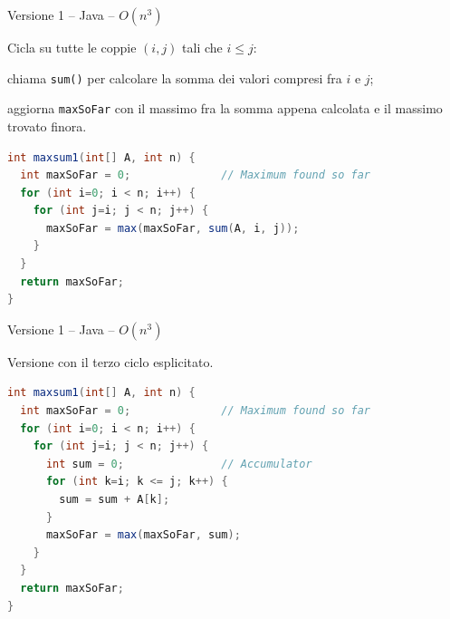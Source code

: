\begin{frame}[fragile]{Versione 1 -- Java -- $O(n^3)$}


\vspace{-6pt}
\begin{mdframed}[style=mybox]
\begingroup
\small
Cicla su tutte le coppie $(i,j)$ tali che $i \leq j$:
\BI
\item chiama \texttt{sum()} per calcolare la somma dei valori compresi fra $i$ e $j$;
\item aggiorna \texttt{maxSoFar} con il massimo fra la somma appena calcolata e il massimo trovato finora.
\EI
\endgroup
\end{mdframed}

\begin{lstlisting}[language=java]
int maxsum1(int[] A, int n) {
  int maxSoFar = 0;              // Maximum found so far
  for (int i=0; i < n; i++) {
    for (int j=i; j < n; j++) {
      maxSoFar = max(maxSoFar, sum(A, i, j));
    }
  }
  return maxSoFar;
}
\end{lstlisting}

\end{frame}

\begin{frame}[fragile]{Versione 1 -- Java -- $O(n^3)$}


\vspace{-6pt}
\begin{mdframed}[style=mybox]
Versione con il terzo ciclo esplicitato.
\end{mdframed}

\begin{lstlisting}[language=java]
int maxsum1(int[] A, int n) {
  int maxSoFar = 0;              // Maximum found so far
  for (int i=0; i < n; i++) {
    for (int j=i; j < n; j++) {
      int sum = 0;               // Accumulator
      for (int k=i; k <= j; k++) {
        sum = sum + A[k];
      }
      maxSoFar = max(maxSoFar, sum);
    }
  }
  return maxSoFar;
}
\end{lstlisting}

\end{frame}


